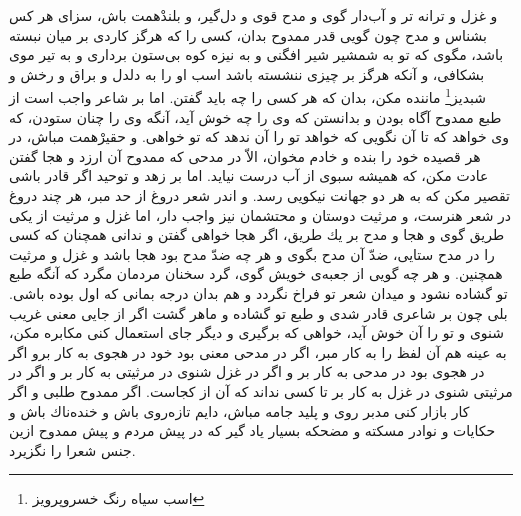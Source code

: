 و غزل و ترانه تر و آب‌دار گوى و مدح قوى و دل‌گير، و بلندْهمت باش، سزاى هر كس بشناس و مدح چون گويى قدر ممدوح بدان، كسى را كه هرگز كاردى بر ميان نبسته باشد، مگوى كه تو به شمشير شير افگنى و به نيزه كوه بى‌ستون بردارى و به تير موى بشكافى، و آنكه هرگز بر چيزى ننشسته باشد اسب او را به دلدل و براق و رخش و شبديز\footnote{اسب سیاه رنگ خسروپرویز} ماننده مكن، بدان كه هر كسى را چه بايد گفتن. اما بر شاعر واجب است از طبع ممدوح آگاه بودن و بدانستن كه وى را چه خوش آيد، آنگه وى را چنان ستودن، كه وى خواهد كه تا آن نگويى كه خواهد تو را آن ندهد كه تو خواهى. و حقيرْهمت مباش، در هر قصيده خود را بنده و خادم مخوان، الاّ در مدحى كه ممدوح آن ارزد و هجا گفتن عادت مكن، كه هميشه سبوى از آب درست نيايد. اما بر زهد و توحيد اگر قادر باشى تقصير مكن كه به هر دو جهانت نيكويى رسد. و اندر شعر دروغ از حد مبر، هر چند دروغ در شعر هنرست، و مرثيت دوستان و محتشمان نيز واجب دار، اما غزل و مرثيت از يكى طريق گوى و هجا و مدح بر يك طريق، اگر هجا خواهى گفتن و ندانى همچنان كه كسى را در مدح ستايى، ضدّ آن مدح بگوى و هر چه ضدّ مدح بود هجا باشد و غزل و مرثيت همچنين. و هر چه گويى از جعبه‌ی خويش گوى، گرد سخنان مردمان مگرد كه آنگه طبع تو گشاده نشود و ميدان شعر تو فراخ نگردد و هم بدان درجه بمانى كه اول بوده باشى. بلى چون بر شاعرى قادر شدى و طبع تو گشاده و ماهر گشت اگر از جايى معنى غريب شنوى و تو را آن خوش آيد، خواهى كه برگيرى و ديگر جاى استعمال كنى مكابره مكن، به عينه هم آن لفظ را به كار مبر، اگر در مدحى معنى بود خود در هجوى به كار برو اگر در هجوى بود در مدحى به كار بر و اگر در غزل شنوى در مرثيتى به كار بر و اگر در مرثيتى شنوى در غزل به كار بر تا كسى نداند كه آن از كجاست. اگر ممدوح طلبى و اگر كار بازار كنى مدبر روى و پليد جامه مباش، دايم تازه‌روى باش و خنده‌ناك باش و حكايات و نوادر مسكته و مضحكه بسيار ياد گير كه در پيش مردم و پيش ممدوح ازين جنس شعرا را نگزيرد.

\newpage



















